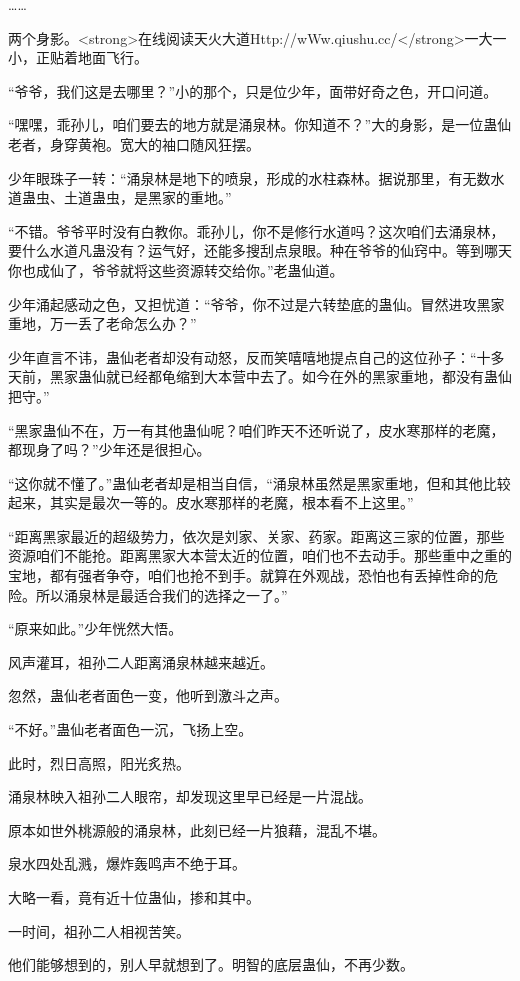 \begin{this_body}
……

两个身影。<strong>在线阅读天火大道Http://wWw.qiushu.cc/</strong>一大一小，正贴着地面飞行。

“爷爷，我们这是去哪里？”小的那个，只是位少年，面带好奇之色，开口问道。

“嘿嘿，乖孙儿，咱们要去的地方就是涌泉林。你知道不？”大的身影，是一位蛊仙老者，身穿黄袍。宽大的袖口随风狂摆。

少年眼珠子一转：“涌泉林是地下的喷泉，形成的水柱森林。据说那里，有无数水道蛊虫、土道蛊虫，是黑家的重地。”

“不错。爷爷平时没有白教你。乖孙儿，你不是修行水道吗？这次咱们去涌泉林，要什么水道凡蛊没有？运气好，还能多搜刮点泉眼。种在爷爷的仙窍中。等到哪天你也成仙了，爷爷就将这些资源转交给你。”老蛊仙道。

少年涌起感动之色，又担忧道：“爷爷，你不过是六转垫底的蛊仙。冒然进攻黑家重地，万一丢了老命怎么办？”

少年直言不讳，蛊仙老者却没有动怒，反而笑嘻嘻地提点自己的这位孙子：“十多天前，黑家蛊仙就已经都龟缩到大本营中去了。如今在外的黑家重地，都没有蛊仙把守。”

“黑家蛊仙不在，万一有其他蛊仙呢？咱们昨天不还听说了，皮水寒那样的老魔，都现身了吗？”少年还是很担心。

“这你就不懂了。”蛊仙老者却是相当自信，“涌泉林虽然是黑家重地，但和其他比较起来，其实是最次一等的。皮水寒那样的老魔，根本看不上这里。”

“距离黑家最近的超级势力，依次是刘家、关家、药家。距离这三家的位置，那些资源咱们不能抢。距离黑家大本营太近的位置，咱们也不去动手。那些重中之重的宝地，都有强者争夺，咱们也抢不到手。就算在外观战，恐怕也有丢掉性命的危险。所以涌泉林是最适合我们的选择之一了。”

“原来如此。”少年恍然大悟。

风声灌耳，祖孙二人距离涌泉林越来越近。

忽然，蛊仙老者面色一变，他听到激斗之声。

“不好。”蛊仙老者面色一沉，飞扬上空。

此时，烈日高照，阳光炙热。

涌泉林映入祖孙二人眼帘，却发现这里早已经是一片混战。

原本如世外桃源般的涌泉林，此刻已经一片狼藉，混乱不堪。

泉水四处乱溅，爆炸轰鸣声不绝于耳。

大略一看，竟有近十位蛊仙，掺和其中。

一时间，祖孙二人相视苦笑。

他们能够想到的，别人早就想到了。明智的底层蛊仙，不再少数。


\end{this_body}
